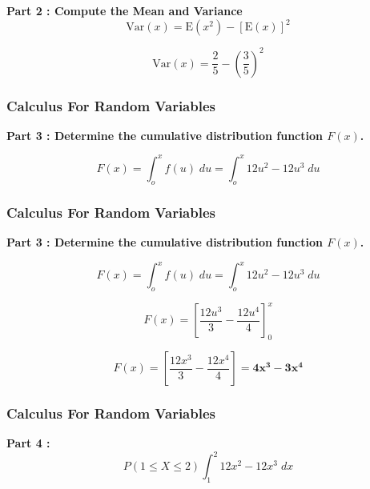 \documentclass[a4]{beamer}
\begin{document}
\begin{frame}
\Large
\vspace{-1.5cm}
\textbf{Part 2 :  Compute the Mean and Variance}\\

\[ \mathrm{Var}(x) = \mathrm{E}(x^2)  - [\mathrm{E}(x)]^2   \]

\[ \mathrm{Var}(x) = \frac{2}{5}  - \left(\frac{3}{5}\right)^2  \]
\end{frame}
\begin{frame}
\frametitle{Calculus For Random Variables}
\Large
\vspace{-2.90cm}
\textbf{Part 3 : Determine the cumulative distribution function $F(x)$.}

\[F(x) = \int_o^x f(u) \;du  =  \int_o^x 12u^2-12u^3 \;du\]

\end{frame}
\begin{frame}
\frametitle{Calculus For Random Variables}
\Large
\vspace{-0.8cm}
\textbf{Part 3 : Determine the cumulative distribution function $F(x)$.}

\[F(x) = \int_o^x f(u) \;du  =  \int_o^x 12u^2-12u^3 \;du\]

\[ F(x) = \left[\frac{12u^3}{3} - \frac{12u^4}{4} \right]^x_0 \]

\[ F(x) = \left[\frac{12x^3}{3} - \frac{12x^4}{4} \right] = \boldsymbol{ 4x^3 - 3x^4 } \]

\end{frame}
\begin{frame}
\frametitle{Calculus For Random Variables}
\Large
\vspace{-0.8cm}
\textbf{Part 4 :}
\[P(1 \leq X \leq 2)   \int_1^2 12x^2-12x^3 \;dx\]

\end{frame}
\end{document}
